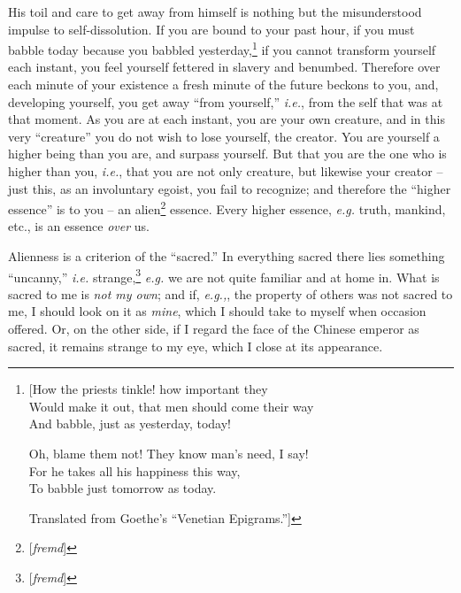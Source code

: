 \documentclass[12pt,a4paper]{book}
\begin{document}
His toil and care to get away from himself is nothing but the misunderstood 
impulse to self-dissolution. If you are bound to your past hour, if you must 
babble today because you babbled yesterday,\footnote{[How the priests tinkle! 
how important they\\
 Would make it out, that men should come their way\\
 And babble, just as yesterday, today!

Oh, blame them not! They know man's need, I say!\\
 For he takes all his happiness this way,\\
 To babble just tomorrow as today.

Translated from Goethe's ``Venetian Epigrams.'']

} if you cannot transform yourself each instant, you feel yourself fettered in 
slavery and benumbed. Therefore over each minute of your existence a fresh 
minute of the future beckons to you, and, developing yourself, you get away 
``from yourself,'' \textit{i.e.}, from the self that was at that moment. As 
you are at each instant, you are your own creature, and in this very 
``creature'' you do not wish to lose yourself, the creator. You are yourself 
a higher being than you are, and surpass yourself. But that you are the one 
who is higher than you, \textit{i.e.}, that you are not only creature, but 
likewise your creator -- just this, as an involuntary egoist, you fail to 
recognize; and therefore the ``higher essence'' is to you -- an 
alien\footnote{[\textit{fremd}]} essence. Every higher essence, \textit{e.g.} 
truth, mankind, etc., is an essence \textit{over} us.

Alienness is a criterion of the ``sacred.'' In everything sacred there lies 
something ``uncanny,'' \textit{i.e.} strange,\footnote{[\textit{fremd}]} 
\textit{e.g.} we are not quite familiar and at home in. What is sacred to me 
is \textit{not my own}; and if, \textit{e.g.,}, the property of others was 
not sacred to me, I should look on it as \textit{mine}, which I should take to 
myself when occasion offered. Or, on the other side, if I regard the face of 
the Chinese emperor as sacred, it remains strange to my eye, which I close at 
its appearance.
\end{document}
